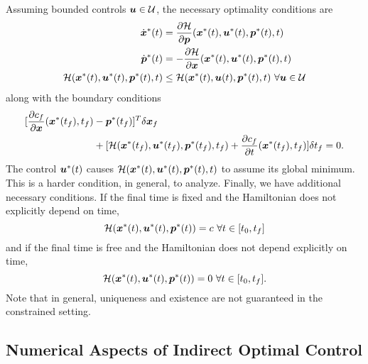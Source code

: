 Assuming bounded controls $\bm{u} \in \mathcal{U}$, the necessary optimality conditions are 
\begin{align}
    \label{eq:nec_pmp_conds1}
    \dot{\bm{x}}^*(t) &= \frac{\partial \mathcal{H}}{\partial \bm{p}}(\bm{x}^*(t),\bm{u}^*(t),\bm{p}^*(t),t)\\
    \dot{\bm{p}}^*(t) &= -\frac{\partial \mathcal{H}}{\partial \bm{x}}(\bm{x}^*(t),\bm{u}^*(t),\bm{p}^*(t),t)\\
    \mathcal{H}(\bm{x}^*(t),\bm{u}^*(t), \bm{p}^*(t), t) &\leq \mathcal{H}(\bm{x}^*(t),\bm{u}(t), \bm{p}^*(t), t) \,\,\forall \bm{u} \in \mathcal{U}
    \label{eq:nec_pmp_conds3}
\end{align}
along with the boundary conditions
\begin{align}
\label{eq:ham_bcs}
    [\frac{\partial c_f}{\partial \bm{x}}(\bm{x}^*(t_f),t_f)& - \bm{p}^*(t_f)]^T \delta \bm{x}_f\\
    & + [ \mathcal{H}(\bm{x}^*(t_f),\bm{u}^*(t_f), \bm{p}^*(t_f), t_f) + \frac{\partial c_f}{\partial t}(\bm{x}^*(t_f),t_f)] \delta t_f = 0. \nonumber
\end{align}
The control $\bm{u}^*(t)$ causes $\mathcal{H}(\bm{x}^*(t),\bm{u}^*(t),\bm{p}^*(t),t)$ to assume its global minimum. This is a harder condition, in general, to analyze. Finally, we have additional necessary conditions. If the final time is fixed and the Hamiltonian does not explicitly depend on time, 
\begin{equation}
    \mathcal{H}(\bm{x}^*(t),\bm{u}^*(t),\bm{p}^*(t)) = c \,\, \forall t \in [t_0,t_f]
\end{equation}
and if the final time is free and the Hamiltonian does not depend explicitly on time, 
\begin{equation}
    \mathcal{H}(\bm{x}^*(t),\bm{u}^*(t),\bm{p}^*(t)) = 0 \,\, \forall t \in [t_0,t_f].
\end{equation}
Note that in general, uniqueness and existence are not guaranteed in the constrained setting. 


\subsection{Numerical Aspects of Indirect Optimal Control}


